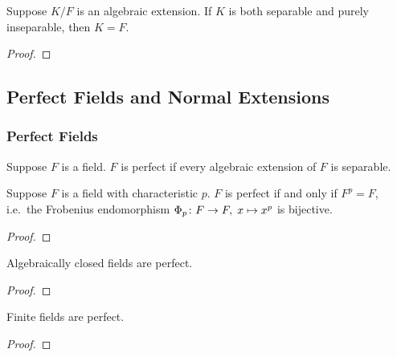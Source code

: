 \begin{theorem}
    Suppose \(K/F\) is an algebraic extension.
    If \(K\) is both separable and purely inseparable,
    then \(K = F\).
\end{theorem}
\begin{proof}
\end{proof}


\subsection{Perfect Fields and Normal Extensions}

\subsubsection*{Perfect Fields}

\begin{definition}
    Suppose \(F\) is a field.
    \(F\) is perfect if every algebraic extension of \(F\) is separable.
\end{definition}
\begin{proposition}
    Suppose \(F\) is a field with characteristic \(p\).
    \(F\) is perfect if and only if \(F^p = F\),
    i.e.\ the Frobenius endomorphism \(\Phi_p\colon F\to F,\;x\mapsto x^p\) is bijective.
\end{proposition}
\begin{proof}
\end{proof}

\begin{proposition}
    Algebraically closed fields are perfect.
\end{proposition}
\begin{proof}
\end{proof}
\begin{theorem}
    Finite fields are perfect.
\end{theorem}
\begin{proof}
\end{proof}

